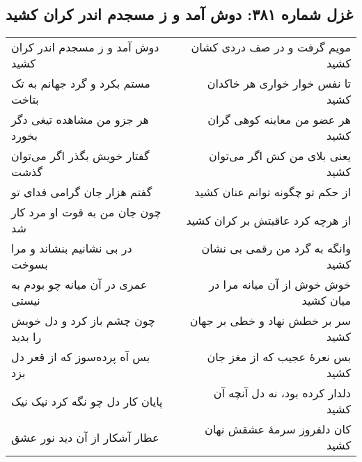 \begin{center}
\section*{غزل شماره ۳۸۱: دوش آمد و ز مسجدم اندر کران کشید}
\label{sec:381}
\begin{longtable}{l p{0.5cm} r}
دوش آمد و ز مسجدم اندر کران کشید
&&
مویم گرفت و در صف دردی کشان کشید
\\
مستم بکرد و گرد جهانم به تک بتاخت
&&
تا نفس خوار خواری هر خاکدان کشید
\\
هر جزو من مشاهده تیغی دگر بخورد
&&
هر عضو من معاینه کوهی گران کشید
\\
گفتار خویش بگذر اگر می‌توان گذشت
&&
یعنی بلای من کش اگر می‌توان کشید
\\
گفتم هزار جان گرامی فدای تو
&&
از حکم تو چگونه توانم عنان کشید
\\
چون جان من به قوت او مرد کار شد
&&
از هرچه کرد عاقبتش بر کران کشید
\\
در بی نشانیم بنشاند و مرا بسوخت
&&
وانگه به گرد من رقمی بی نشان کشید
\\
عمری در آن میانه چو بودم به نیستی
&&
خوش خوش از آن میانه مرا در میان کشید
\\
چون چشم باز کرد و دل خویش را بدید
&&
سر بر خطش نهاد و خطی بر جهان کشید
\\
بس آه پرده‌سوز که از قعر دل بزد
&&
بس نعرهٔ عجیب که از مغز جان کشید
\\
پایان کار دل چو نگه کرد نیک نیک
&&
دلدار کرده بود، نه دل آنچه آن کشید
\\
عطار آشکار از آن دید نور عشق
&&
کان دلفروز سرمهٔ عشقش نهان کشید
\\
\end{longtable}
\end{center}
